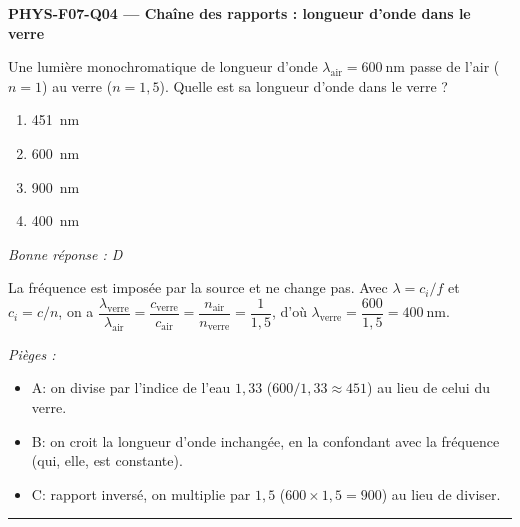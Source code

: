 \documentclass[11pt,a4paper]{article}
\begin{document}
\noindent\textbf{PHYS-F07-Q04 --- Chaîne des rapports : longueur d'onde dans le verre}\par
Une lumière monochromatique de longueur d'onde $\lambda_{\text{air}}=\qty{600}{\nano\metre}$ passe de l'air ($n=1$) au verre ($n=1{,}5$). Quelle est sa longueur d'onde dans le verre ?
\begin{enumerate}[label=\Alph*)]
\item \qty{451}{\nano\metre}
\item \qty{600}{\nano\metre}
\item \qty{900}{\nano\metre}
\item \qty{400}{\nano\metre}
\end{enumerate}
\textit{Bonne réponse : D}\par
La fréquence est imposée par la source et ne change pas. Avec $\lambda=c_i/f$ et $c_i=c/n$, on a $\dfrac{\lambda_{\text{verre}}}{\lambda_{\text{air}}}=\dfrac{c_{\text{verre}}}{c_{\text{air}}}=\dfrac{n_{\text{air}}}{n_{\text{verre}}}=\dfrac{1}{1{,}5}$, d'où $\lambda_{\text{verre}}=\dfrac{600}{1{,}5}=\qty{400}{\nano\metre}$.\par
\textit{Pièges :}
\begin{itemize}
\item A: on divise par l'indice de l'eau $1{,}33$ ($600/1{,}33\approx 451$) au lieu de celui du verre.
\item B: on croit la longueur d'onde inchangée, en la confondant avec la fréquence (qui, elle, est constante).
\item C: rapport inversé, on multiplie par $1{,}5$ ($600\times1{,}5=900$) au lieu de diviser.
\end{itemize}
\vspace{8pt}\hrule\vspace{8pt}
\end{document}
